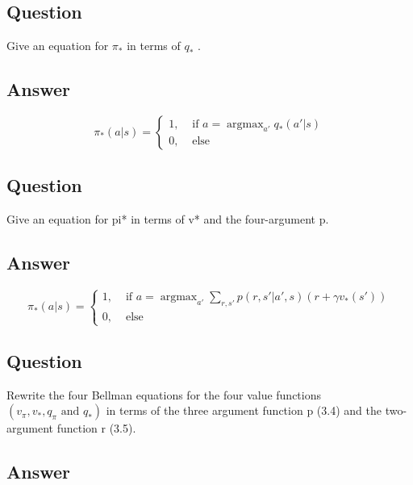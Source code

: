 \documentclass[11pt]{article}
\DeclareMathOperator*{\argmax}{argmax}
\begin{document}
    \subsection{Question}

    Give an equation for $ \pi_{*} $ in terms of $ q_* $ .

    \subsection*{Answer}

    \begin{equation}
        \pi_*(a|s) =
        \begin{cases}
            1,& \text{ if } a = \argmax_{a'}q_{*}(a'|s) \\
            0,& \text{ else }
        \end{cases}
    \end{equation}

    \subsection{Question}

    Give an equation for pi* in terms of v* and the four-argument p.

    \subsection*{Answer}

    \begin{equation}
        \pi_*(a|s) =
        \begin{cases}
            1,& \text{ if } a = \argmax_{a'} \sum_{r,s'} p(r, s'| a', s)(r + \gamma v_*(s')) \\
            0,& \text{ else }
        \end{cases}
    \end{equation}

    \subsection{Question}

    Rewrite the four Bellman equations for the four value functions $ (v_\pi ,v_* , q_\pi \text{ and } q_* ) $ in terms of the three argument function p (3.4) and the two-argument function r (3.5).

    \subsection*{Answer}
\end{document}
